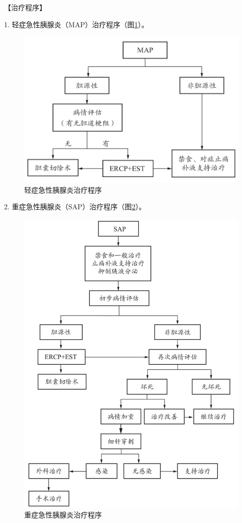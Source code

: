 【治疗程序】

1. 轻症急性胰腺炎（MAP）治疗程序（图\ref{fig3-18-1}）。

\begin{figure}[!htbp]
 \centering
 \includegraphics{./images/Image00107.jpg}
 \captionsetup{justification=centering}
 \caption{轻症急性胰腺炎治疗程序}
 \label{fig3-18-1}
  \end{figure} 

2. 重症急性胰腺炎（SAP）治疗程序（图\ref{fig3-18-2}）。

\begin{figure}[!htbp]
 \centering
 \includegraphics{./images/Image00108.jpg}
 \captionsetup{justification=centering}
 \caption{重症急性胰腺炎治疗程序}
 \label{fig3-18-2}
  \end{figure} 

